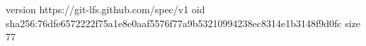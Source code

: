 version https://git-lfs.github.com/spec/v1
oid sha256:76dfe6572222f75a1e8e0aaf5576f77a9b53210994238ec8314e1b3148f9d0fc
size 77
